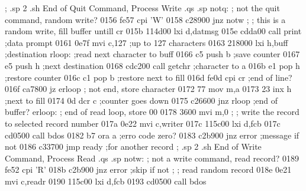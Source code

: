                          ;
.sp 2
.sh
                          End of Quit Command, Process Write
.qs
.sp
                         notq:
                         ;        not the quit command, random write?
0156 fe57                         cpi    'W'
0158 c28900                       jnz    notw
                         ;
                         ;        this is a random write, fill buffer untill cr 
015b 114d00                       lxi    d,datmsg
015e cdda00                       call   print     ;data prompt
0161 0e7f                         mvi    c,127     ;up to 127 characters
0163 218000                       lxi    h,buff    ;destination
                         rloop:   ;read next character to buff
0166 c5                           push   b         ;save counter
0167 e5                           push   h         ;next destination
0168 cdc200                       call   getchr    ;character to a
016b e1                           pop    h         ;restore counter
016c c1                           pop    b         ;restore next to fill
016d fe0d                         cpi    cr        ;end of line?
016f ca7800                       jz     erloop    
                         ;        not end, store character
0172 77                           mov    m,a 
0173 23                           inx    h         ;next to fill
0174 0d                           dcr    c         ;counter goes down
0175 c26600                       jnz    rloop     ;end of buffer?
                         erloop:
                         ;        end of read loop, store 00
0178 3600                         mvi    m,0
                         ;
                         ;        write the record to selected record number
017a 0e22                         mvi    c,writer
017c 115c00                       lxi    d,fcb
017c cd0500                       call   bdos
0182 b7                           ora    a         ;erro code zero?
0183 c2b900                       jnz    error     ;message if not
0186 c33700                       jmp    ready     ;for another record
                         ;
.sp 2
.sh
                          End of Write Command, Process Read
.qs
.sp
                         notw:
                         ;        not a write command, read record?
0189 fe52                         cpi    'R'
018b c2b900                       jnz    error     ;skip if not
                         ;
                         ;        read random record
018e 0e21                         mvi    c,readr
0190 115c00                       lxi    d,fcb
0193 cd0500                       call   bdos
